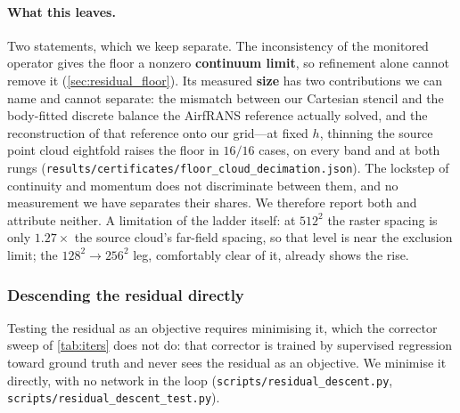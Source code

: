 \paragraph{What this leaves.} Two statements, which we keep separate. The inconsistency
of the monitored operator gives the floor a nonzero \textbf{continuum limit}, so
refinement alone cannot remove it (\autoref{sec:residual_floor}). Its measured
\textbf{size} has two contributions we can name and cannot separate: the mismatch
between our Cartesian stencil and the body-fitted discrete balance the AirfRANS
reference actually solved, and the reconstruction of that reference onto our grid---at
fixed $h$, thinning the source point cloud eightfold raises the floor in $16/16$ cases,
on every band and at both rungs
(\texttt{results/certificates/floor\_cloud\_decimation.json}). The lockstep of
continuity and momentum does not discriminate between them, and no measurement we have
separates their shares. We therefore report both and attribute neither. A limitation of
the ladder itself: at $512^2$ the raster spacing is only $1.27\times$ the source cloud's
far-field spacing, so that level is near the exclusion limit; the $128^2\!\to\!256^2$
leg, comfortably clear of it, already shows the rise.



\subsubsection{Descending the residual directly}
\label{sec:descent}

Testing the residual as an objective requires minimising it, which the corrector sweep of
\autoref{tab:iters} does not do: that corrector is trained by supervised regression toward
ground truth and never sees the residual as an objective. We minimise it directly, with
no network in the loop (\texttt{scripts/residual\_descent.py},
\texttt{scripts/residual\_descent\_test.py}).

